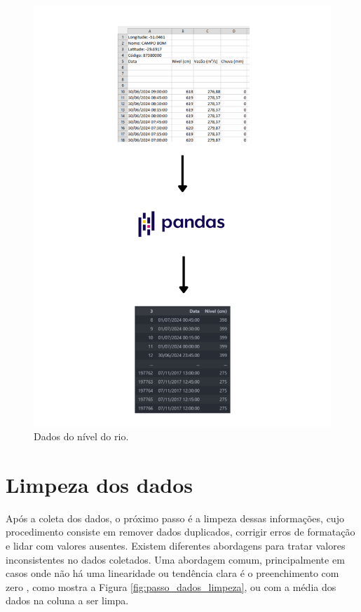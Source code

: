 \begin{figure}[H]
	\caption{\label{fig:base_sema}Dados do nível do rio.}
	\begin{center}
		\includegraphics[scale=0.5]{figuras/base_sema.png}
	\end{center}
\end{figure}

\section{Limpeza dos dados}
\label{sec:limpeza_dos_dados}

Após a coleta dos dados, o próximo passo é a limpeza dessas informações, cujo procedimento consiste em remover dados duplicados, corrigir erros de formatação e lidar com valores ausentes. Existem diferentes abordagens para tratar valores inconsistentes no dados coletados. Uma abordagem comum, principalmente em casos onde não há uma linearidade ou tendência clara é o preenchimento com zero \cite{cousineau2010outliers}, como mostra a Figura \ref{fig:passo_dados_limpeza}, ou com a média dos dados na coluna a ser limpa.

